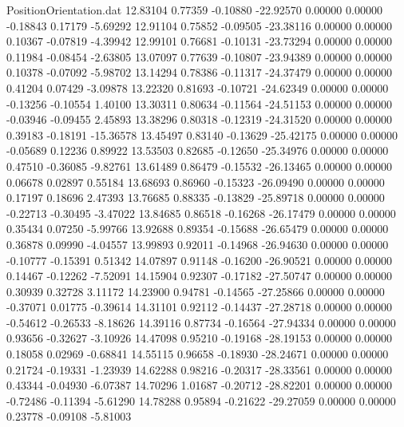 \begin{filecontents}{PositionOrientation.dat}
  12.83104    0.77359   -0.10880   -22.92570    0.00000    0.00000   -0.18843    0.17179   -5.69292
  12.91104    0.75852   -0.09505   -23.38116    0.00000    0.00000    0.10367   -0.07819   -4.39942
  12.99101    0.76681   -0.10131   -23.73294    0.00000    0.00000    0.11984   -0.08454   -2.63805
  13.07097    0.77639   -0.10807   -23.94389    0.00000    0.00000    0.10378   -0.07092   -5.98702
  13.14294    0.78386   -0.11317   -24.37479    0.00000    0.00000    0.41204    0.07429   -3.09878
  13.22320    0.81693   -0.10721   -24.62349    0.00000    0.00000   -0.13256   -0.10554    1.40100
  13.30311    0.80634   -0.11564   -24.51153    0.00000    0.00000   -0.03946   -0.09455    2.45893
  13.38296    0.80318   -0.12319   -24.31520    0.00000    0.00000    0.39183   -0.18191  -15.36578
  13.45497    0.83140   -0.13629   -25.42175    0.00000    0.00000   -0.05689    0.12236    0.89922
  13.53503    0.82685   -0.12650   -25.34976    0.00000    0.00000    0.47510   -0.36085   -9.82761
  13.61489    0.86479   -0.15532   -26.13465    0.00000    0.00000    0.06678    0.02897    0.55184
  13.68693    0.86960   -0.15323   -26.09490    0.00000    0.00000    0.17197    0.18696    2.47393
  13.76685    0.88335   -0.13829   -25.89718    0.00000    0.00000   -0.22713   -0.30495   -3.47022
  13.84685    0.86518   -0.16268   -26.17479    0.00000    0.00000    0.35434    0.07250   -5.99766
  13.92688    0.89354   -0.15688   -26.65479    0.00000    0.00000    0.36878    0.09990   -4.04557
  13.99893    0.92011   -0.14968   -26.94630    0.00000    0.00000   -0.10777   -0.15391    0.51342
  14.07897    0.91148   -0.16200   -26.90521    0.00000    0.00000    0.14467   -0.12262   -7.52091
  14.15904    0.92307   -0.17182   -27.50747    0.00000    0.00000    0.30939    0.32728    3.11172
  14.23900    0.94781   -0.14565   -27.25866    0.00000    0.00000   -0.37071    0.01775   -0.39614
  14.31101    0.92112   -0.14437   -27.28718    0.00000    0.00000   -0.54612   -0.26533   -8.18626
  14.39116    0.87734   -0.16564   -27.94334    0.00000    0.00000    0.93656   -0.32627   -3.10926
  14.47098    0.95210   -0.19168   -28.19153    0.00000    0.00000    0.18058    0.02969   -0.68841
  14.55115    0.96658   -0.18930   -28.24671    0.00000    0.00000    0.21724   -0.19331   -1.23939
  14.62288    0.98216   -0.20317   -28.33561    0.00000    0.00000    0.43344   -0.04930   -6.07387
  14.70296    1.01687   -0.20712   -28.82201    0.00000    0.00000   -0.72486   -0.11394   -5.61290
  14.78288    0.95894   -0.21622   -29.27059    0.00000    0.00000    0.23778   -0.09108   -5.81003

\end{filecontents}
